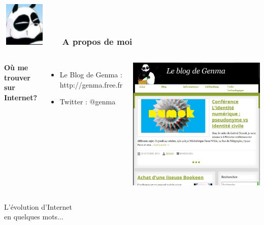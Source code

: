 \documentclass{beamer}
\begin{document}
\begin{frame}
\frametitle{\includegraphics[scale=0.4]{./images/Genma.jpg} \ \ \  A propos de moi  }
\begin{columns}[c] 
\textbf{Où me trouver sur Internet?}
\begin{itemize}
\item Le Blog de Genma : http://genma.free.fr
\item Twitter : @genma
\end{itemize}
\includegraphics[scale=0.40] {./images/blog.png} 
\end{columns}
\end{frame}

{
\begin{frame}
\begin{center}
\Huge{L'évolution d'Internet\\en quelques mots...}
\end{center}
\end{frame}
}
\end{document}
